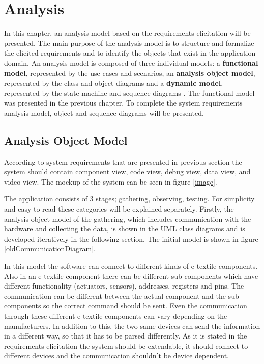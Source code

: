 \chapter{Analysis}

	In this chapter, an analysis model based on the requirements elicitation will be presented. The main purpose of the analysis model is to structure and formalize the elicited requirements and to identify the objects that exist in the application domain. An analysis model is composed of three individual models: a \textbf{functional model}, represented by the use cases and scenarios, an \textbf{analysis object model}, represented by the class and object diagrams and a \textbf{dynamic model}, represented by the state machine and sequence diagrams \cite{Bruegge2004}. The functional model was presented in the previous chapter. To complete the system requirements analysis model, object and sequence diagrams will be presented.

	
\section{Analysis Object Model}
According to system requirements that are presented in previous section the system should contain component view, code view, debug view, data view, and video view. The mockup of the system can be seen in figure \ref{image}.


	The application consists of 3 stages; gathering, observing, testing. For simplicity and easy to read these categories will be explained separately. Firstly, the analysis object model of the gathering, which includes communication with the hardware and collecting the data, is shown in the UML class diagrams and is developed iteratively in the following section. The initial model is shown in figure \ref{oldCommunicationDiagram}.




In this model the software can connect to different kinds of e-textile components. Also in an e-textile component there can be different sub-components which have different functionality (actuators, sensors), addresses, registers and pins. The communication can be different between the actual component and the sub-components so the correct command should be sent. Even the communication through these different e-textile components can vary depending on the manufacturers. In addition to this, the two same devices can send the information in a different way, so that it has to be parsed differently. As it is stated in the requirements elicitation the system should be extendable, it should connect to different devices and the communication shouldn't be device dependent. \\

